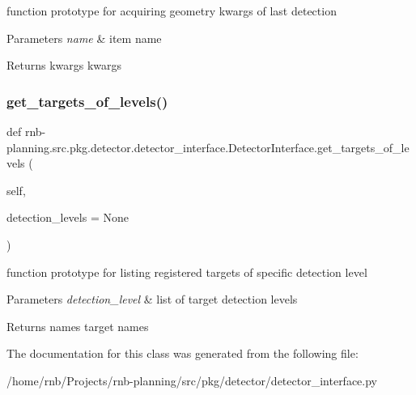 function prototype for acquiring geometry kwargs of last detection 


\begin{DoxyParams}{Parameters}
{\em name} & item name \\
\hline
\end{DoxyParams}
\begin{DoxyReturn}{Returns}
kwargs kwargs 
\end{DoxyReturn}
\mbox{\label{classrnb-planning_1_1src_1_1pkg_1_1detector_1_1detector__interface_1_1_detector_interface_aca91ec41e0e87dcca165c6eb10806357}} 
\subsubsection{\texorpdfstring{get\+\_\+targets\+\_\+of\+\_\+levels()}{get\_targets\_of\_levels()}}
{\footnotesize\ttfamily def rnb-\/planning.\+src.\+pkg.\+detector.\+detector\+\_\+interface.\+Detector\+Interface.\+get\+\_\+targets\+\_\+of\+\_\+levels (\begin{DoxyParamCaption}\item[{}]{self,  }\item[{}]{detection\+\_\+levels = {\ttfamily None} }\end{DoxyParamCaption})}



function prototype for listing registered targets of specific detection level 


\begin{DoxyParams}{Parameters}
{\em detection\+\_\+level} & list of target detection levels \\
\hline
\end{DoxyParams}
\begin{DoxyReturn}{Returns}
names target names 
\end{DoxyReturn}


The documentation for this class was generated from the following file\+:\begin{DoxyCompactItemize}
\item 
/home/rnb/\+Projects/rnb-\/planning/src/pkg/detector/detector\+\_\+interface.\+py\end{DoxyCompactItemize}
